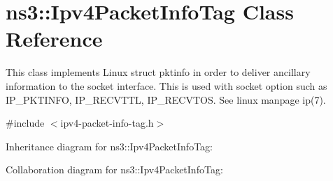 \hypertarget{classns3_1_1Ipv4PacketInfoTag}{}\section{ns3\+:\+:Ipv4\+Packet\+Info\+Tag Class Reference}
\label{classns3_1_1Ipv4PacketInfoTag}


This class implements Linux struct pktinfo in order to deliver ancillary information to the socket interface. This is used with socket option such as I\+P\+\_\+\+P\+K\+T\+I\+N\+FO, I\+P\+\_\+\+R\+E\+C\+V\+T\+TL, I\+P\+\_\+\+R\+E\+C\+V\+T\+OS. See linux manpage ip(7).  




{\ttfamily \#include $<$ipv4-\/packet-\/info-\/tag.\+h$>$}



Inheritance diagram for ns3\+:\+:Ipv4\+Packet\+Info\+Tag\+:


Collaboration diagram for ns3\+:\+:Ipv4\+Packet\+Info\+Tag\+:
